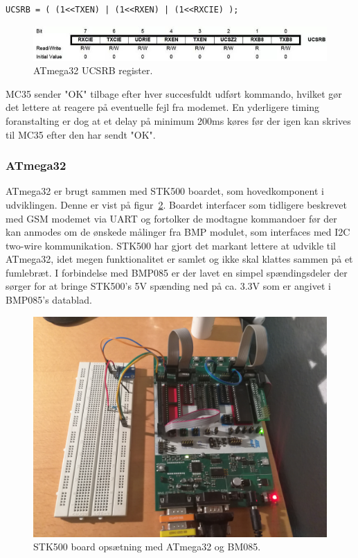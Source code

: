 \begin{lstlisting}[caption=Initiering af UCSRB,label=code:initucsrb] 
	UCSRB = ( (1<<TXEN) | (1<<RXEN) | (1<<RXCIE) );
\end{lstlisting}

\begin{figure}[h]
	\centering
	\includegraphics[width=\linewidth]{figs/avr_register_ucsrb.jpg}
	\caption{ATmega32 UCSRB register.}
	\label{fig:regucsrb}
\end{figure}

MC35 sender "OK" tilbage efter hver succesfuldt udført kommando, hvilket gør det lettere at reagere på eventuelle fejl fra modemet. En yderligere timing foranstalting er dog at et delay på minimum 200ms køres
 før der igen kan skrives til MC35 efter den har sendt "OK". 


\subsubsection{ATmega32}
ATmega32 er brugt sammen med STK500 boardet, som hovedkomponent i udviklingen. Denne er vist på figur~\ref{fig:deviceatmege32}. 
Boardet interfacer som tidligere beskrevet med GSM modemet via UART og fortolker de modtagne kommandoer før der kan anmodes om de ønskede målinger fra BMP modulet, som interfaces med I2C two-wire kommunikation.
STK500 har gjort det markant lettere at udvikle til ATmega32, idet megen funktionalitet er samlet og ikke skal klattes sammen på et fumlebræt. I forbindelse med BMP085 er der lavet en simpel
 spændingsdeler der sørger for at bringe STK500's 5V spænding ned på ca. 3.3V som er angivet i BMP085's datablad.

\begin{figure}[h]
	\centering
	\includegraphics[width=0.7\linewidth]{figs/device_atmega32.jpg}
	\caption{STK500 board opsætning med ATmega32 og BM085.}
	\label{fig:deviceatmege32}
\end{figure}

